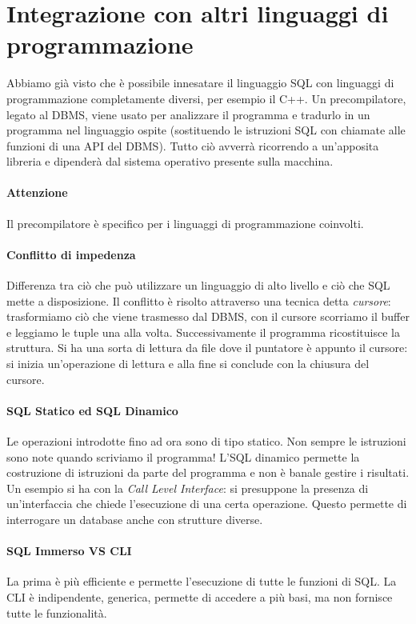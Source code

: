 \section{Integrazione con altri linguaggi di programmazione}
Abbiamo già visto che è possibile innesatare il linguaggio SQL con linguaggi di programmazione completamente diversi, per esempio il C++. Un precompilatore, legato al DBMS, viene usato per analizzare il programma e tradurlo in un programma nel linguaggio ospite (sostituendo le istruzioni SQL con chiamate alle funzioni di una API del DBMS). Tutto ciò avverrà ricorrendo a un'apposita libreria e dipenderà dal sistema operativo presente sulla macchina.
\paragraph{Attenzione} Il precompilatore è specifico per i linguaggi di programmazione coinvolti.
\paragraph{Conflitto di impedenza} Differenza tra ciò che può utilizzare un linguaggio di alto livello e ciò che SQL mette a disposizione. Il conflitto è risolto attraverso una tecnica detta \emph{cursore}: trasformiamo ciò che viene trasmesso dal DBMS, con il cursore scorriamo il buffer e leggiamo le tuple una alla volta. Successivamente il programma ricostituisce la struttura. Si ha una sorta di lettura da file dove il puntatore è appunto il cursore: si inizia un'operazione di lettura e alla fine si conclude con la chiusura del cursore.
\paragraph{SQL Statico ed SQL Dinamico} Le operazioni introdotte fino ad ora sono di tipo statico. Non sempre le istruzioni sono note quando scriviamo il programma! L'SQL dinamico permette la costruzione di istruzioni da parte del programma e non è banale gestire i risultati.\\
Un esempio si ha con la \emph{Call Level Interface}: si presuppone la presenza di un'interfaccia che chiede l'esecuzione di una certa operazione. Questo permette di interrogare un database anche con strutture diverse.
\paragraph{SQL Immerso VS CLI} La prima è più efficiente e permette l'esecuzione di tutte le funzioni di SQL. La CLI è indipendente, generica, permette di accedere a più basi, ma non fornisce tutte le funzionalità.
